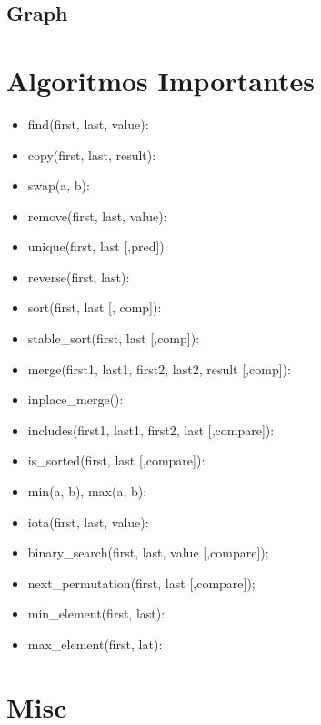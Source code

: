 \documentclass{article}
\begin{document}
\subsection{Graph}

\section{Algoritmos Importantes}
\begin{itemize}
   \item find(first, last, value):
   \item copy(first, last, result):
   \item swap(a, b):
   \item remove(first, last, value):
   \item unique(first, last [,pred]):
   \item reverse(first, last):
   \item sort(first, last [, comp]):
   \item stable\_sort(first, last [,comp]):
   \item merge(first1, last1, first2, last2, result [,comp]):
   \item inplace\_merge():
   \item includes(first1, last1, first2, last [,compare]):
   \item is\_sorted(first, last [,compare]):
   \item min(a, b), max(a, b):
   \item iota(first, last, value):
   \item binary\_search(first, last, value [,compare]);
   \item next\_permutation(first, last [,compare]);
   \item min\_element(first, last):
   \item max\_element(first, lat):
\end{itemize}

\section{Misc}

\end{document}
